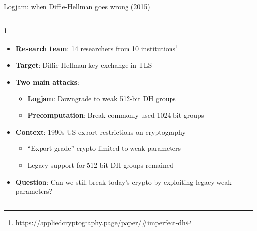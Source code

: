 \ifdefined\PRESENTATION\else\PassOptionsToClass{handout}{beamer}\fi\documentclass[aspectratio=169, lualatex]{beamer}
\begin{document}
\begin{frame}{Logjam: when Diffie-Hellman goes wrong (2015)}
	\begin{columns}[c]
		\begin{column}{1\textwidth}
			\begin{itemize}
				\item \textbf{Research team}: 14 researchers from 10 institutions\footnote{\url{https://appliedcryptography.page/paper/\#imperfect-dh}}
				\item \textbf{Target}: Diffie-Hellman key exchange in TLS
				\item \textbf{Two main attacks}:
				      \begin{itemize}
					      \item \textbf{Logjam}: Downgrade to weak 512-bit DH groups
					      \item \textbf{Precomputation}: Break commonly used 1024-bit groups
				      \end{itemize}
				\item \textbf{Context}: 1990s US export restrictions on cryptography
				      \begin{itemize}
					      \item ``Export-grade'' crypto limited to weak parameters
					      \item Legacy support for 512-bit DH groups remained
				      \end{itemize}
				\item \textbf{Question}: Can we still break today's crypto by exploiting legacy weak parameters?
			\end{itemize}
		\end{column}
	\end{columns}
\end{frame}
\end{document}
